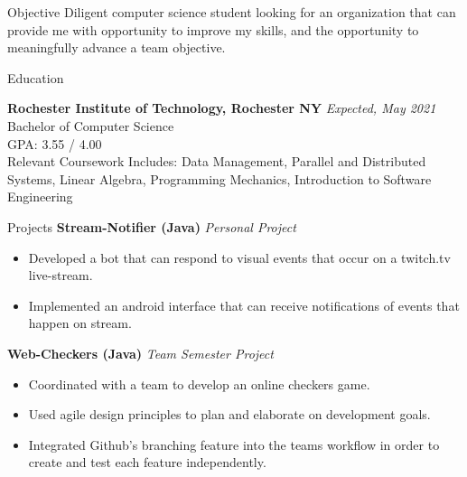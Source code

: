 \documentclass{resume} %
\begin{document}

\begin{rSection}{Objective}
Diligent computer science student looking for an organization that can provide me with opportunity to improve my skills, and the opportunity to meaningfully advance a team objective. 
\end{rSection}

\begin{rSection}{Education}

{\bf Rochester Institute of Technology, Rochester NY} \hfill {\em Expected, May 2021} 
\\ Bachelor of Computer Science
\\ GPA: 3.55 / 4.00
\\ Relevant Coursework Includes:  Data Management, Parallel and Distributed Systems, Linear Algebra, Programming Mechanics, Introduction to Software Engineering 
\end{rSection}

\begin{rSection}{Projects}
{\bf Stream-Notifier (Java)} \hfill {\em Personal Project}

\begin{itemize}
    \item Developed a bot that can respond to visual events that occur on a twitch.tv live-stream. 
    \item Implemented an android interface that can receive notifications of events that happen on stream.
\end{itemize}

{\bf Web-Checkers (Java)} \hfill {\em Team Semester Project}

\begin{itemize}
    \item Coordinated with a team to develop an online checkers game.
    \item Used agile design principles to plan and elaborate on development goals.
    \item Integrated Github's branching feature into the teams workflow in order to create and test each feature independently.
\end{itemize}

\end{rSection}
\end{document}

